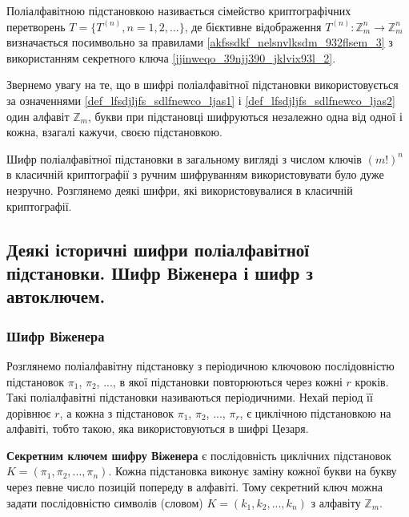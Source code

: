 \begin{definition}
    \label{def_lfsdjljfs_sdlfnewco_ljas2}
    Поліалфавітною підстановкою називається сімейство
    криптографічних перетворень $T = \{T^{(n)}, n = 1, 2, ...\}$, де
    бієктивне відображення $T^{(n)}: \mathbb{Z}_m^n \rightarrow \mathbb{Z}_m^n$
    визначається посимвольно за правилами \ref{akfssdkf_nelsnvlksdm_932flsem_3}
    з використанням секретного ключа \ref{jjinweqo_39njj390_jklvix93l_2}.
\end{definition}

Звернемо увагу на те, що в шифрі поліалфавітної підстановки
використовується за означеннями \ref{def_lfsdjljfs_sdlfnewco_ljas1} і
\ref{def_lfsdjljfs_sdlfnewco_ljas2} один алфавіт $\mathbb{Z}_m$, букви при
підстановці шифруються незалежно одна від одної і кожна, взагалі кажучи,
своєю підстановкою.

Шифр поліалфавітної підстановки в загальному вигляді з числом ключів
$(m!)^n$ в класичній криптографії з ручним шифруванням використовувати
було дуже незручно. Розглянемо деякі шифри, які використовувалися в
класичній криптографії.

\subsection{Деякі історичні шифри поліалфавітної підстановки. Шифр
Віженера і шифр з автоключем.}

\subsubsection{Шифр Віженера}

\begin{definition}
    Розглянемо поліалфавітну підстановку з періодичною ключовою
    послідовністю підстановок $\pi_1$, $\pi_2$, ..., в якої підстановки повторюються через
    кожні $r$ кроків. Такі поліалфавітні підстановки називаються періодичними.
    Нехай період її дорівнює $r$, а кожна з підстановок $\pi_1$, $\pi_2$, ...,
    $\pi_r$, є циклічною підстановкою на алфавіті, тобто такою, яка використовуються
    в шифрі Цезаря.
\end{definition}

\textbf{Секретним ключем шифру Віженера} є послідовність циклічних
підстановок $K = (\pi_1, \pi_2, ..., \pi_n)$. Кожна підстановка виконує заміну кожної
букви на букву через певне число позицій попереду в алфавіті. Тому
секретний ключ можна задати послідовністю символів (словом)
$K = (k_1, k_2, ..., k_n)$ з алфавіту $\mathbb{Z}_m$.


